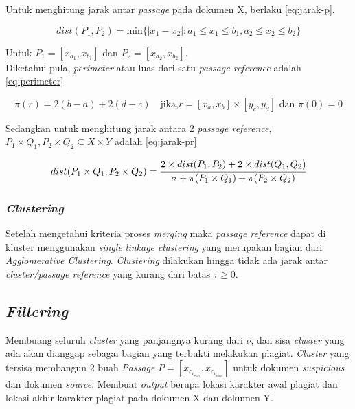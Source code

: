 \documentclass[../Proposal.tex]{subfiles}
\begin{document}
		\noindent Untuk menghitung jarak antar \textit{passage} pada dokumen X, berlaku \ref{eq:jarak-p}.
		
		\begin{center}
		\begin{equation}
			dist(P_{1},P_{2}) = \text{min} \{|x_{1}-x_{2}|:a_{1} \leq x_{1} \leq b_{1}, a_{2} \leq x_{2} \leq b_{2} \} 
			\label{eq:jarak-p}
		\end{equation}  
		\end{center}
		
		\noindent Untuk $P_{1} = [ x_{a_{1}}, x_{b_{1}} ] $ dan $P_{2} = [ x_{a_{2}}, x_{b_{2}} ]$. \\
		
		\noindent Diketahui pula, \textit{perimeter} atau luas dari satu \textit{passage reference} adalah \ref{eq:perimeter}
		
		\begin{center}
		\begin{equation}
			\pi(r) = 2 (b - a) + 2 (d - c) \quad \text{jika,} r=[x_{a}, x_{b}] \times [y_{c}, y_{d}] \text{ dan } \pi(0) = 0
			\label{eq:perimeter}
		\end{equation}  
		\end{center}
		
		\noindent Sedangkan untuk menghitung jarak antara 2 \textit{passage reference}, $P_{1} \times Q_{1},P_{2} \times Q_{2} \subseteq X \times Y$ adalah \ref{eq:jarak-pr} 
		
		\begin{center}
			\begin{equation}
			dist(P_{1} \times Q_{1},P_{2} \times Q_{2}) = \cfrac{2 \times dist(P_{1},P_{2}) + 2 \times dist(Q_{1},Q_{2})}{\sigma + \pi(P_{1} \times Q_{1}) + \pi(P_{2} \times Q_{2})}
			\end{equation}
			\label{eq:jarak-pr}  
		\end{center}
	
		\subsubsection{\textit{Clustering}}
		Setelah mengetahui kriteria proses \textit{merging} maka \textit{passage reference} dapat di kluster menggunakan \textit{single linkage clustering} yang merupakan bagian dari \textit{Agglomerative Clustering}. \textit{Clustering} dilakukan hingga tidak ada jarak antar \textit{cluster/passage reference} yang kurang dari batas $\tau \geq 0$.
		 
		\subsection{\textit{Filtering}}
		Membuang seluruh \textit{cluster} yang panjangnya kurang dari $\nu$, dan sisa \textit{cluster} yang ada akan dianggap sebagai bagian yang terbukti melakukan plagiat. \textit{Cluster} yang tersisa membangun 2 buah \textit{Passage} $P = [x_{c_{i_{min}}}, x_{c_{i_{max}}}]$ untuk dokumen \textit{suspicious} dan dokumen \textit{source}.   Membuat \textit{output} berupa lokasi karakter awal plagiat dan lokasi akhir karakter plagiat pada dokumen X dan dokumen Y. \\
		
\end{document}
